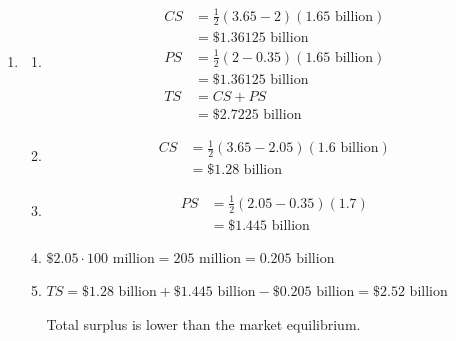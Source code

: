 \documentclass{article}
\begin{document}
\begin{enumerate}
\begin{enumerate}
	\item \begin{align*}
		TR &= Q_{tax} \cdot t \\
		&= 45 \cdot 1.6 \\
		&= 72
		\end{align*}
		
	\item Pre-tax quantity:
		\begin{align*}
		105 - 15P &= 25P - 15 \\
		120 &= 40P \\
		3 &= P^* \\
		Q^* &= 25(3) - 15 \\
		&= 60
		\end{align*}
		Deadweight loss:
		\begin{align*}
		DWL &= \frac{1}{2}(4 - 2.4)(60 - 45) \\
		&= \frac{4}{5}(15) \\
		&= 12
		\end{align*}
	
	\end{enumerate}
	
\item

	\begin{enumerate}
	
	\item \begin{align*}
		CS &= \frac{1}{2}(3.65 - 2)(1.65 \text{ billion}) \\
		&= \$1.36125 \text{ billion} \\
		PS &= \frac{1}{2}(2 - 0.35)(1.65 \text{ billion}) \\
		&= \$1.36125 \text{ billion} \\
		TS &= CS + PS \\
		&= \$2.7225 \text{ billion}
		\end{align*}
		
	\item \begin{align*}
		CS &= \frac{1}{2}(3.65 - 2.05)(1.6 \text{ billion}) \\
		&= \$1.28 \text{ billion}
		\end{align*}
		
	\item \begin{align*}
		PS &= \frac{1}{2}(2.05 - 0.35)(1.7) \\
		&= \$1.445 \text{ billion}
		\end{align*}
		
	\item $\$2.05 \cdot 100 \text{ million} = 205 \text{ million} = 0.205 \text{ billion}$
	
	\item $TS = \$1.28 \text{ billion} + \$1.445 \text{ billion} - \$0.205 \text{ billion} = \$2.52 \text{ billion}$ 
	
		Total surplus is lower than the market equilibrium.
	
	\end{enumerate}

\end{enumerate}
\end{document}
